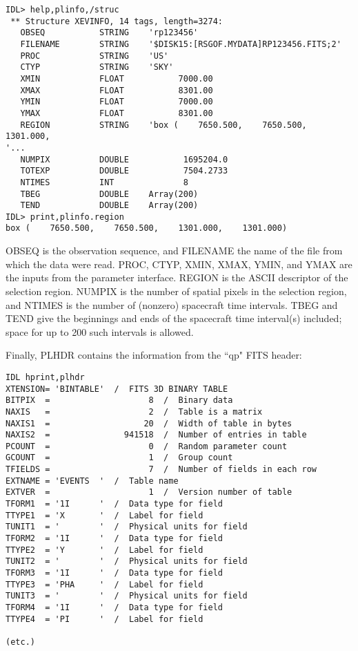 \medskip\noindent
\begin{verbatim}
IDL> help,plinfo,/struc
 ** Structure XEVINFO, 14 tags, length=3274:
   OBSEQ           STRING    'rp123456'
   FILENAME        STRING    '$DISK15:[RSGOF.MYDATA]RP123456.FITS;2'
   PROC            STRING    'US'
   CTYP            STRING    'SKY'
   XMIN            FLOAT           7000.00
   XMAX            FLOAT           8301.00
   YMIN            FLOAT           7000.00
   YMAX            FLOAT           8301.00
   REGION          STRING    'box (    7650.500,    7650.500,    1301.000,
'...
   NUMPIX          DOUBLE           1695204.0
   TOTEXP          DOUBLE           7504.2733
   NTIMES          INT              8
   TBEG            DOUBLE    Array(200)
   TEND            DOUBLE    Array(200)
IDL> print,plinfo.region
box (    7650.500,    7650.500,    1301.000,    1301.000)
\end{verbatim}
OBSEQ is the observation sequence, and FILENAME the name of the file from
which the data were read. PROC, CTYP, XMIN, XMAX, YMIN, and YMAX are the
inputs from the parameter interface. REGION is the ASCII descriptor of
the selection region. NUMPIX is the number of spatial pixels in the
selection region, and NTIMES is the number of (nonzero) spacecraft time
intervals. TBEG and TEND give the beginnings and ends of the spacecraft
time interval(s) included; space for up to 200 such intervals is allowed.
 
Finally, PLHDR contains the information from the ``qp" FITS header:

\medskip\noindent
\begin{verbatim}
IDL hprint,plhdr
XTENSION= 'BINTABLE'  /  FITS 3D BINARY TABLE
BITPIX  =                    8  /  Binary data
NAXIS   =                    2  /  Table is a matrix
NAXIS1  =                   20  /  Width of table in bytes
NAXIS2  =               941518  /  Number of entries in table
PCOUNT  =                    0  /  Random parameter count
GCOUNT  =                    1  /  Group count
TFIELDS =                    7  /  Number of fields in each row
EXTNAME = 'EVENTS  '  /  Table name
EXTVER  =                    1  /  Version number of table
TFORM1  = '1I      '  /  Data type for field
TTYPE1  = 'X       '  /  Label for field
TUNIT1  = '        '  /  Physical units for field
TFORM2  = '1I      '  /  Data type for field
TTYPE2  = 'Y       '  /  Label for field
TUNIT2  = '        '  /  Physical units for field
TFORM3  = '1I      '  /  Data type for field
TTYPE3  = 'PHA     '  /  Label for field
TUNIT3  = '        '  /  Physical units for field
TFORM4  = '1I      '  /  Data type for field
TTYPE4  = 'PI      '  /  Label for field
 
(etc.)
\end{verbatim}
 
